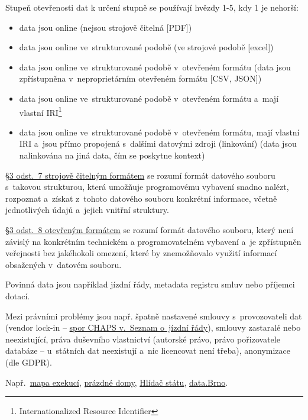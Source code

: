 Stupeň otevřenosti dat k určení stupně se používají hvězdy 1-5, kdy 1 je nehorší:
\begin{itemize}[noitemsep]
\item data jsou online (nejsou strojově čitelná [PDF])
\item data jsou online ve~strukturované podobě (ve strojové podobě [excel])
\item data jsou online ve~strukturované podobě v~otevřeném formátu (data jsou zpřístupněna v~neproprietárním otevřeném formátu [CSV, JSON])
\item data jsou online ve~strukturované podobě v~otevřeném formátu a~mají vlastní IRI\footnote{Internationalized Resource Identifier} 
\item data jsou online ve~strukturované podobě v~otevřeném formátu, mají vlastní IRI a~jsou přímo propojená s~dalšími datovými zdroji (linkování) (data jsou nalinkována na jiná data, čím se poskytne kontext)
\end{itemize}

\href{https://www.zakonyprolidi.cz/cs/1999-106#p3-7}{§3 odst.~7 strojově čitelným formátem} se rozumí formát datového souboru s~takovou strukturou, která umožňuje programovému vybavení snadno nalézt, rozpoznat a~získat z~tohoto datového souboru konkrétní informace, včetně jednotlivých údajů a~jejich vnitřní struktury.

\href{https://www.zakonyprolidi.cz/cs/1999-106#p3-8}{§3 odst.~8 otevřeným formátem} se rozumí formát datového souboru, který není závislý na konkrétním technickém a programovatelném vybavení a~je zpřístupněn veřejnosti bez jakéhokoli omezení, které by znemožňovalo využití informací obsažených v~datovém souboru.

Povinná data jsou například jízdní řády, metadata registru smluv nebo příjemci dotací.

Mezi právními problémy jsou např. špatně nastavené smlouvy s~provozovateli dat (vendor lock-in -- \href{http://ictjudikatura.law.muni.cz/wiki/6_As_38/2015_-_51_-_\%C5\%BD\%C3\%A1dost_o_specifick\%C3\%BD_form\%C3\%A1t_informac\%C3\%AD_(CHAPS)}{spor CHAPS v.~Seznam o~jízdní řády}), smlouvy zastaralé nebo neexistující, práva duševního vlastnictví (autorské právo, právo pořizovatele databáze -- u~státních dat neexistují a~nic licencovat není třeba), anonymizace (dle GDPR).

Např.~\href{https://mapaexekuci.cz}{mapa exekucí}, \href{https://prazdnedomy.cz}{prázdné domy}, \href{https://hlidacstatu.cz}{Hlídač státu}, \href{https://data.brno.cz}{data.Brno}.
